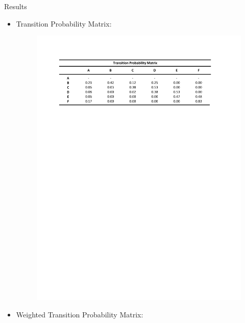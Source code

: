 \documentclass{beamer}
\begin{document}
\begin{frame}{Results}{}
	\begin{itemize}		
		\item{Transition Probability Matrix:} \newline			
			\begin{figure}
				\begin{center}
					\vspace*{-0.6 in}
					\hspace*{-0.6in}
					\includegraphics[width=1\textwidth]{trp_mat.pdf} 
				\end{center}
			\end{figure}			
		\vspace{-3.8in}
		\item{Weighted Transition Probability Matrix:} \newline			
			\begin{figure}
				\begin{center}
					\vspace*{-0.6in}
					\hspace*{-0.6in}

\end{center}
\end{figure}
\end{itemize}
\end{frame}
\end{document}
